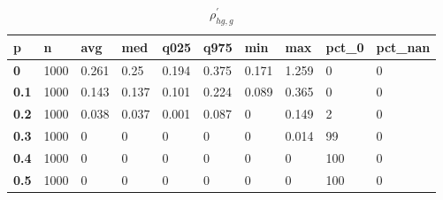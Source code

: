 \begin{table}[h]
 \centering 
\footnotesize
\caption{$\rho_{hg,g}^\prime $}
\label{tab:alphahgg}
\begin{tabular}[h]{|l|l|l|l|l|l|l|l|l|l|
    } \hline
\textbf{ p} & \textbf{ n} & \textbf{ avg} & \textbf{ med} & \textbf{ q025} & \textbf{ q975} & \textbf{ min} & \textbf{ max} & \textbf{ pct\_0} & \textbf{ pct\_nan}
    \\ \hline
  \textbf{  0} & 1000 & 0.261 &  0.25 & 0.194 & 0.375 & 0.171 & 1.259 &   0 & 0
    \\ \hline
  \textbf{0.1} & 1000 & 0.143 & 0.137 & 0.101 & 0.224 & 0.089 & 0.365 &   0 & 0
    \\ \hline
  \textbf{0.2} & 1000 & 0.038 & 0.037 & 0.001 & 0.087 &     0 & 0.149 &   2 & 0
    \\ \hline
  \textbf{0.3} & 1000 &     0 &     0 &     0 &     0 &     0 & 0.014 &  99 & 0
    \\ \hline
  \textbf{0.4} & 1000 &     0 &     0 &     0 &     0 &     0 &     0 & 100 & 0
    \\ \hline
  \textbf{0.5} & 1000 &     0 &     0 &     0 &     0 &     0 &     0 & 100 & 0
    \\ \hline
 \end{tabular}
 \end{table}
